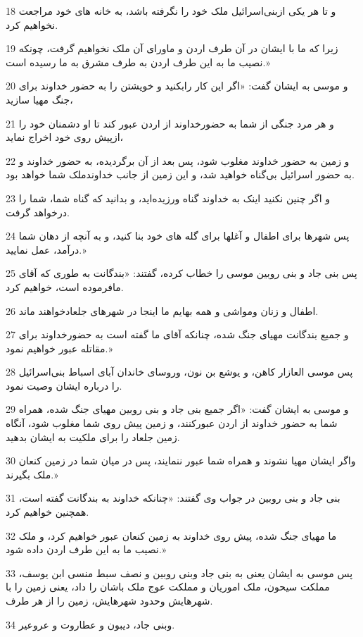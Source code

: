 \par 18 و تا هر یکی ازبنی‌اسرائیل ملک خود را نگرفته باشد، به خانه های خود مراجعت نخواهیم کرد.
\par 19 زیرا که ما با ایشان در آن طرف اردن و ماورای آن ملک نخواهیم گرفت، چونکه نصیب ما به این طرف اردن به طرف مشرق به ما رسیده است.»
\par 20 و موسی به ایشان گفت: «اگر این کار رابکنید و خویشتن را به حضور خداوند برای جنگ مهیا سازید،
\par 21 و هر مرد جنگی از شما به حضورخداوند از اردن عبور کند تا او دشمنان خود را ازپیش روی خود اخراج نماید،
\par 22 و زمین به حضور خداوند مغلوب شود، پس بعد از آن برگردیده، به حضور خداوند و به حضور اسرائیل بی‌گناه خواهید شد، و این زمین از جانب خداوندملک شما خواهد بود.
\par 23 و اگر چنین نکنید اینک به خداوند گناه ورزیده‌اید، و بدانید که گناه شما، شما را درخواهد گرفت.
\par 24 پس شهرها برای اطفال و آغلها برای گله های خود بنا کنید، و به آنچه از دهان شما درآمد، عمل نمایید.»
\par 25 پس بنی جاد و بنی روبین موسی را خطاب کرده، گفتند: «بندگانت به طوری که آقای مافرموده است، خواهیم کرد.
\par 26 اطفال و زنان ومواشی و همه بهایم ما اینجا در شهرهای جلعادخواهند ماند.
\par 27 و جمیع بندگانت مهیای جنگ شده، چنانکه آقای ما گفته است به حضورخداوند برای مقاتله عبور خواهیم نمود.»
\par 28 پس موسی العازار کاهن، و یوشع بن نون، وروسای خاندان آبای اسباط بنی‌اسرائیل را درباره ایشان وصیت نمود.
\par 29 و موسی به ایشان گفت: «اگر جمیع بنی جاد و بنی روبین مهیای جنگ شده، همراه شما به حضور خداوند از اردن عبورکنند، و زمین پیش روی شما مغلوب شود، آنگاه زمین جلعاد را برای ملکیت به ایشان بدهید.
\par 30 واگر ایشان مهیا نشوند و همراه شما عبور ننمایند، پس در میان شما در زمین کنعان ملک بگیرند.»
\par 31 بنی جاد و بنی روبین در جواب وی گفتند: «چنانکه خداوند به بندگانت گفته است، همچنین خواهیم کرد.
\par 32 ما مهیای جنگ شده، پیش روی خداوند به زمین کنعان عبور خواهیم کرد، و ملک نصیب ما به این طرف اردن داده شود.»
\par 33 پس موسی به ایشان یعنی به بنی جاد وبنی روبین و نصف سبط منسی ابن یوسف، مملکت سیحون، ملک اموریان و مملکت عوج ملک باشان را داد، یعنی زمین را با شهرهایش وحدود شهرهایش، زمین را از هر طرف.
\par 34 وبنی جاد، دیبون و عطاروت و عروعیر.
